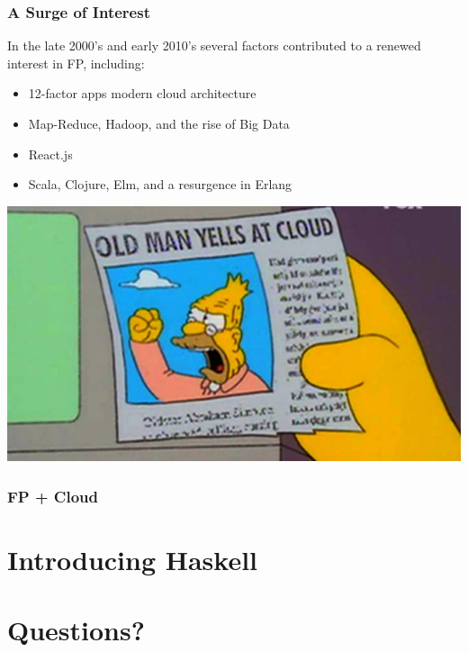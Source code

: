 \documentclass{beamer}
\begin{document}
\begin{frame}
  \frametitle{A Surge of Interest}
  In the late 2000's and early 2010's several factors contributed to a
  renewed interest in FP, including:
  \begin{itemize}
  \item 12-factor apps modern cloud architecture
  \item Map-Reduce, Hadoop, and the rise of Big Data
  \item React.js
  \item Scala, Clojure, Elm, and a resurgence in Erlang
  \end{itemize}
\end{frame}

\begin{frame}
  \begin{center}
    \includegraphics[width=.90\paperwidth]{images/cloud.jpg}
  \end{center}
\end{frame}

\begin{frame}
  \frametitle{FP + Cloud}

\end{frame}


\section{Introducing Haskell}

\section{Questions?}
\end{document}
